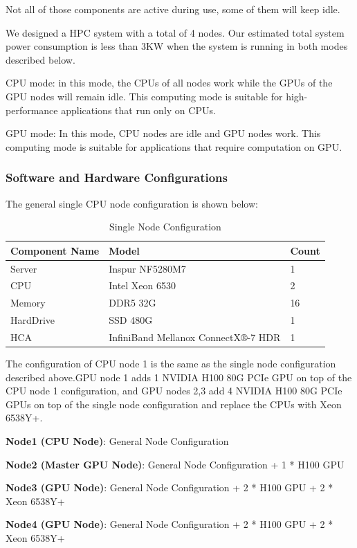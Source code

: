\documentclass[a4paper,12pt]{article}
\begin{document}
Not all of those components are active during use, some of them will keep idle.

We designed a HPC system with a total of 4 nodes. Our estimated total system power consumption is less than 3KW when the system is running in both modes described below.

CPU mode: in this mode, the CPUs of all nodes work while the GPUs of the GPU nodes will remain idle. This computing mode is suitable for high-performance applications that run only on CPUs.

GPU mode: In this mode, CPU nodes are idle and GPU nodes work. This computing mode is suitable for applications that require computation on GPU.

\subsubsection{Software and Hardware Configurations}

The general single CPU node configuration is shown below:
\begin{table}[H]
\centering
\caption{Single Node Configuration}
\vspace{0.5cm}
\begin{tabular}{lll}
\toprule
Component Name & Model & Count \\
\midrule
Server & Inspur NF5280M7 & 1 \\
CPU & Intel Xeon 6530 & 2 \\
Memory & DDR5 32G & 16 \\
HardDrive & SSD 480G & 1 \\
HCA & InfiniBand Mellanox ConnectX®-7 HDR & 1 \\
\bottomrule
\end{tabular}
\end{table}

The configuration of CPU node 1 is the same as the single node configuration described above.GPU node 1 adds 1 NVIDIA H100 80G PCIe GPU on top of the CPU node 1 configuration, and GPU nodes 2,3 add 4 NVIDIA H100 80G PCIe GPUs on top of the single node configuration and replace the CPUs with Xeon 6538Y+.

\textbf{Node1 (CPU Node)}: General Node Configuration

\textbf{Node2 (Master GPU Node)}: General Node Configuration + 1 * H100 GPU

\textbf{Node3 (GPU Node)}: General Node Configuration + 2 * H100 GPU + 2 * Xeon 6538Y+

\textbf{Node4 (GPU Node)}: General Node Configuration + 2 * H100 GPU + 2 * Xeon 6538Y+
\end{document}

